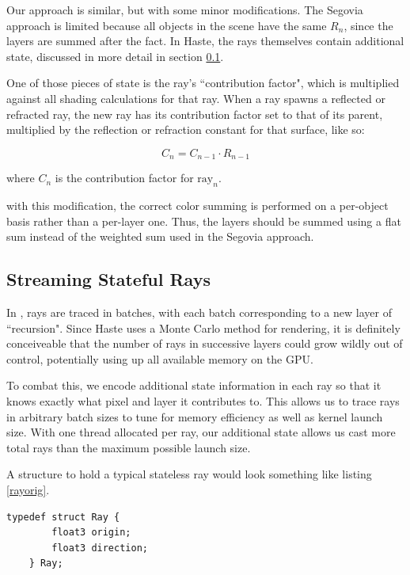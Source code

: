 \documentclass{acmsiggraph}                     %
\begin{document}
    Our approach is similar, but with some minor modifications. The Segovia approach is limited
    because all objects in the scene have the same $R_{n}$, since the layers are summed after
    the fact. In Haste, the rays themselves contain additional state, discussed in more detail
    in section \ref{sec:raystate}.
    
    One of those pieces of state is the ray's ``contribution factor", which is multiplied against
    all shading calculations for that ray. When a ray spawns a reflected or refracted ray, the
    new ray has its contribution factor set to that of its parent, multiplied by the reflection
    or refraction constant for that surface, like so:

    \begin{equation}
        C_{n} = C_{n - 1} \cdot R_{n - 1}
    \end{equation}

    where $C_{n}$ is the contribution factor for $\textrm{ray}_{n}$. 

    with this modification, the correct color summing is performed on a per-object basis rather
    than a per-layer one. Thus, the layers should be summed using a flat sum instead of the weighted
    sum used in the Segovia approach.

    \subsection{Streaming Stateful Rays}
    \label{sec:raystate}

    In \cite{Segovia09}, rays are traced in batches, with each batch
    corresponding to a new layer of ``recursion". Since Haste uses a Monte Carlo method for
    rendering, it is definitely conceiveable that the number of rays in successive layers could
    grow wildly out of control, potentially using up all available memory on the GPU.
    
    To combat this, we encode additional state information in each ray so that it knows exactly
    what pixel and layer it contributes to. This allows us to trace rays in arbitrary batch sizes
    to tune for memory efficiency as well as kernel launch size. With one thread allocated per
    ray, our additional state allows us cast more total rays than the maximum possible launch size.

    A structure to hold a typical stateless ray would look something like listing \ref{rayorig}.

    \begin{lstlisting}[caption=A traditional stateless ray structure.,label=rayorig]
    typedef struct Ray {
        float3 origin;
        float3 direction;
    } Ray;
    \end{lstlisting}
\end{document}

